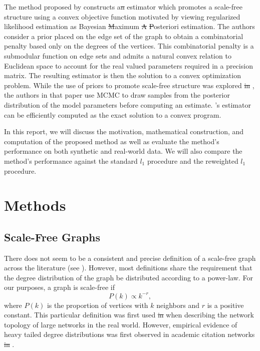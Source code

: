 \documentclass{uwstat572}
\newcommand{\vmdel}[1]{\sout{#1}}
\newcommand{\vmadd}[1]{\textbf{\color{red}{#1}}}
\theoremstyle{remark}
\theoremstyle{definition}
\begin{document}
The method proposed by \cite{Defazio2012} constructs a\vmdel{n} \vmadd{Gaussian precision matrix} estimator which promotes a scale-free structure using a convex objective function motivated by viewing regularized likelihood estimation as Bayesian \vmdel{M}\vmadd{m}aximum \vmdel{A} \vmadd{a} \vmdel{P}\vmadd{p}osteriori estimation.  
The authors consider a prior placed on the edge set of the graph to obtain a combinatorial penalty based only on the degrees of the vertices. This combinatorial penalty is a submodular function on edge sets and admits a natural convex relation to Euclidean space to account for the real valued parameters required in a precision matrix. The resulting estimator is then the solution to a convex optimization problem. While the use of priors to promote scale-free structure was explored \vmdel{in} \vmadd{by} \cite{sheridan2010}, the authors in that paper use MCMC to draw samples from the posterior distribution of the model parameters before computing an estimate.  \citet{Defazio2012}'s estimator can be efficiently computed as the exact solution to a convex program.

In this report, we will discuss the motivation, mathematical construction, and computation of the proposed method as well as evaluate the method's performance on both synthetic and real-world data.  We will also compare the method's performance against the standard $l_1$ procedure and the reweighted $l_1$ procedure.  

\section{Methods}

\subsection{Scale-Free Graphs}

There does not seem to be a consistent and precise definition of a scale-free graph across the literature (see \citep{li2005}).  However, most definitions share the requirement that the degree distribution of the graph be distributed according to a power-law. For our purposes, a graph is scale-free if 
\begin{equation}\label{powerlaw}
P(k) \propto k^{-r},
\end{equation}
where $P(k)$ is the proportion of vertices with $k$ neighbors and $r$ is a positive constant.  This particular definition was first used \vmdel{in} \vmadd{by} \cite{Barabasi99} when describing the network topology of large networks in the real world.  However, empirical evidence of heavy tailed degree distributions was first observed in academic citation networks \vmdel{in} \citep{de1965networks}.
\end{document}
